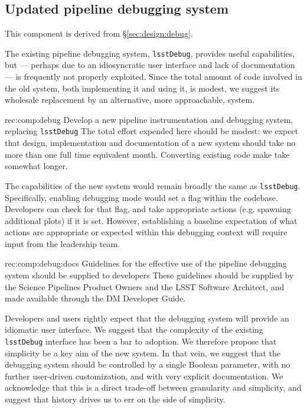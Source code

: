 \subsection{Updated pipeline debugging system}
\label{sec:comp:debug}

This component is derived from \S\ref{sec:design:debug}.

The existing pipeline debugging system, \texttt{lsstDebug}, provides useful
capabilities, but --- perhaps due to an idiosyncratic user interface and lack
of documentation --- is frequently not properly exploited. Since the total
amount of code involved in the old system, both implementing it and using it,
is modest, we suggest its wholesale replacement by an alternative, more
approachable, system.

\begin{recommendation}
    {rec:comp:debug}
    {Develop a new pipeline instrumentation and debugging system, replacing \texttt{lsstDebug}}
The total effort expended here should be modest: we expect that design,
implementation and documentation of a new system should take no more than one
full time equivalent month. Converting existing code make take somewhat
longer.
\end{recommendation}

The capabilities of the new system would remain broadly the same as
\texttt{lsstDebug}.  Specifically, enabling debugging mode would set a flag
within the codebase.  Developers can check for that flag, and take appropriate
actions (e.g.  spawning additional plots) if it is set. However, establishing
a baseline expectation of what actions are appropriate or expected within
this debugging context will require input from the leadership team.

\begin{recommendation}
    {rec:comp:debug:docs}
    {Guidelines for the effective use of the pipeline debugging system should be supplied to developers}
These guidelines should be supplied by the Science Pipelines Product Owners
and the LSST Software Architect, and made available through the DM Developer
Guide.
\end{recommendation}

Developers and users rightly expect that the debugging system will provide an
idiomatic user interface. We suggest that the complexity of the existing
\texttt{lsstDebug} interface has been a bar to adoption. We therefore propose
that simplicity be a key aim of the new system. In that vein, we suggest that
the debugging system should be controlled by a single Boolean parameter, with
no further user-driven customization, and with very explicit documentation. We
acknowledge that this is a direct trade-off between granularity and
simplicity, and suggest that history drives us to err on the side of
simplicity.

